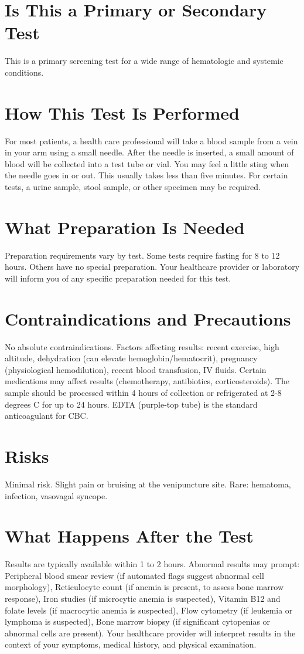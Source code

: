 \section*{Is This a Primary or Secondary Test}
This is a primary screening test for a wide range of hematologic and systemic conditions.

\section*{How This Test Is Performed}
For most patients, a health care professional will take a blood sample from a vein in your arm using a small needle. After the needle is inserted, a small amount of blood will be collected into a test tube or vial. You may feel a little sting when the needle goes in or out. This usually takes less than five minutes. For certain tests, a urine sample, stool sample, or other specimen may be required.

\section*{What Preparation Is Needed}
Preparation requirements vary by test. Some tests require fasting for 8 to 12 hours. Others have no special preparation. Your healthcare provider or laboratory will inform you of any specific preparation needed for this test.

\section*{Contraindications and Precautions}
No absolute contraindications. Factors affecting results: recent exercise, high altitude, dehydration (can elevate hemoglobin/hematocrit), pregnancy (physiological hemodilution), recent blood transfusion, IV fluids. Certain medications may affect results (chemotherapy, antibiotics, corticosteroids). The sample should be processed within 4 hours of collection or refrigerated at 2-8 degrees C for up to 24 hours. EDTA (purple-top tube) is the standard anticoagulant for CBC.

\section*{Risks}
Minimal risk. Slight pain or bruising at the venipuncture site. Rare: hematoma, infection, vasovagal syncope.

\section*{What Happens After the Test}
Results are typically available within 1 to 2 hours. Abnormal results may prompt: Peripheral blood smear review (if automated flags suggest abnormal cell morphology), Reticulocyte count (if anemia is present, to assess bone marrow response), Iron studies (if microcytic anemia is suspected), Vitamin B12 and folate levels (if macrocytic anemia is suspected), Flow cytometry (if leukemia or lymphoma is suspected), Bone marrow biopsy (if significant cytopenias or abnormal cells are present). Your healthcare provider will interpret results in the context of your symptoms, medical history, and physical examination.

